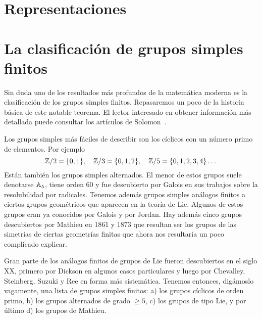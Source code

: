 \section*{Representaciones}



\section*{La clasificación de grupos simples finitos}

Sin duda uno de los resultados más profundos de la matemática moderna es la
clasificación de los grupos simples finitos. Repasaremos un poco de la historia
básica de este notable teorema. El lector interesado en obtener información más
detallada puede consultar los artículos de Solomon~\cite{MR1824893,MR3854074}. 

Los grupos simples más fáciles de describir son los cíclicos con un número
primo de elementos. Por ejemplo
\[
	\mathbb{Z}/2=\{0,1\},\quad
	\mathbb{Z}/3=\{0,1,2\},\quad
	\mathbb{Z}/5=\{0,1,2,3,4\}\dots
\]
Están también los grupos simples alternados. El menor de estos grupos suele
denotarse $\mathbb{A}_5$, tiene orden 60 y fue descubierto por Galois en sus trabajos
sobre la resolubilidad por radicales. Tenemos además grupos simples análogos
finitos a ciertos grupos geométricos que aparecen en la teoría de Lie. Algunos
de estos grupos eran ya conocidos por Galois y por Jordan. Hay además cinco
grupos descubiertos por Mathieu en 1861 y 1873 que resultan ser los grupos de
las simetrías de ciertas geometrías finitas que ahora nos resultaría un poco
complicado explicar. 

Gran parte de los análogos finitos de grupos de Lie fueron descubiertos en el
siglo XX, primero por Dickson en algunos casos particulares y luego por
Chevalley, Steinberg, Suzuki y Ree en forma más sistemática. Tenemos entonces,
digámoslo vagamente, una lista de grupos simples finitos: a) los grupos
cíclicos de orden primo, b) los grupos alternados de grado $\geq 5$, c) los
grupos de tipo Lie, y por último d) los grupos de Mathieu. 

